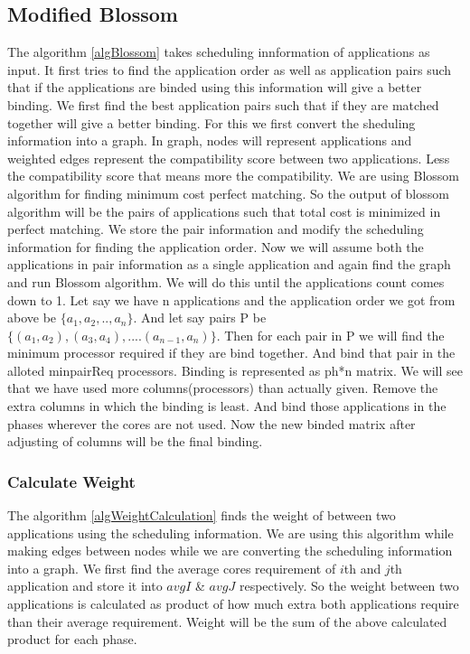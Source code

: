 \documentclass[10pt, conference]{IEEEtran}
\begin{document}
\subsection{Modified Blossom}
The algorithm \ref{algBlossom} takes scheduling innformation of applications as input. It first tries to find the application order as well as application pairs such that if the applications are binded using this information will give a better binding. We first find the best application pairs such that if they are matched together will give a better binding. For this we first convert the sheduling information into a graph. In graph, nodes will represent applications and weighted edges represent the compatibility score between two applications. Less the compatibility score that means more the compatibility. We are using Blossom algorithm for finding minimum cost perfect matching. So the output of blossom algorithm will be the pairs of applications such that total cost is minimized in perfect matching. We store the pair information and modify the scheduling information for finding the application order. Now we will assume both the applications in pair information as a single application and again find the graph and run Blossom algorithm. We will do this until the applications count comes down to 1. Let say we have n applications and the application order we got from above be $\{a_1, a_2,.., a_{n}\}$. And let say pairs P be $\{(a_1,a_2),(a_3,a_4),....(a_{n-1},a_{n})\}$. Then for each pair in P we will find the minimum processor required if they are bind together. And bind that pair in the alloted minpairReq processors. Binding is represented as ph*n matrix. We will see that we have used more columns(processors) than actually given. Remove the extra columns in which the binding is least. And bind those applications in the phases wherever the cores are not used. Now the new binded matrix after adjusting of columns will be the final binding.


\subsubsection{Calculate Weight}
The algorithm \ref{algWeightCalculation} finds the weight of between two applications using the scheduling information. We are using this algorithm while making edges between nodes while we are converting the scheduling information into a graph. We first find the average cores requirement of $i$th and $j$th application and store it into $avgI$ \& $avgJ$ respectively. So the weight between two applications is calculated as product of how much extra both applications require than their average requirement. Weight will be the sum of the above calculated product for each phase.
\end{document}
